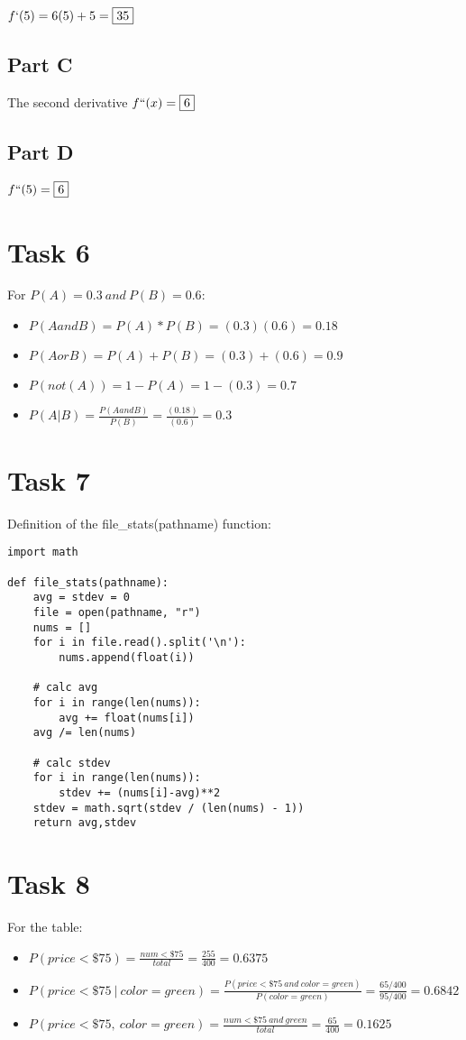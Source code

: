\documentclass{article}
\begin{document}
$f`(5) = 6(5) + 5 = \boxed{35}$

\subsection*{Part C}

The second derivative $f``(x) = \boxed{6}$

\subsection*{Part D}

$f``(5) = \boxed{6}$

\section*{Task 6}
For $P(A) = 0.3\ and\ P(B) = 0.6$:

\begin{itemize}
    \item $P(A and B) = P(A) * P(B) = (0.3)(0.6) = \boxed{0.18}$
    \item $P(A or B) = P(A) + P(B) = (0.3) + (0.6) = \boxed{0.9}$
    \item $P(not(A)) = 1 - P(A) = 1 - (0.3) = \boxed{0.7}$
    \item $P(A | B) = \frac{P(A and B)}{P(B)} = \frac{(0.18)}{(0.6)} = \boxed{0.3}$
\end{itemize}

\section{Task 7}

Definition of the file\_stats(pathname) function:

\begin{lstlisting}
import math

def file_stats(pathname):
    avg = stdev = 0
    file = open(pathname, "r")
    nums = []
    for i in file.read().split('\n'):
        nums.append(float(i))

    # calc avg
    for i in range(len(nums)):
        avg += float(nums[i])
    avg /= len(nums)

    # calc stdev
    for i in range(len(nums)):
        stdev += (nums[i]-avg)**2
    stdev = math.sqrt(stdev / (len(nums) - 1))
    return avg,stdev
\end{lstlisting}

\section*{Task 8}
For the table:

\begin{itemize}
    \item $P(price<\$75) = \frac{num<\$75}{total} = \frac{255}{400} = \boxed{0.6375}$
    \item $P(price<\$75\ |\ color=green) = \frac{P(price<\$75\ and\ color=green)}{P(color=green)} = \frac{65/400}{95/400} = \boxed{0.6842}$
    \item $P(price<\$75,\ color=green) = \frac{num<\$75\ and\ green}{total} = \frac{65}{400} = \boxed{0.1625}$
\end{itemize}
\end{document}

